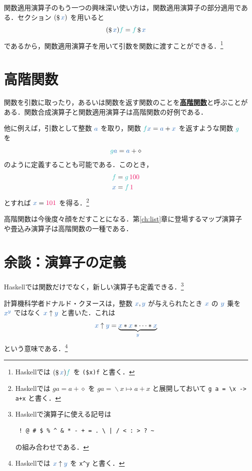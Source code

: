 \documentclass[a5paper,twoside,fleqn,draft]{jsbook}
\def\constantColor{WildStrawberry}
\def\varColor{NavyBlue}
\def\funcColor{BlueGreen}
\newcommand{\programminglanguage}[1]{\textsf{#1}}
\newcommand{\haskell}{\programminglanguage{Haskell}}
\newcommand{\keyword}[1]{{\underline{\textbf{#1}}}}
\newcommand{\code}[1]{\texttt{#1}}
\newcommand{\mConstant}[1]{\textcolor{\constantColor}{#1}}
\newcommand{\mOneNumber}{{\mConstant{1}}}
\newcommand{\mVar}[1]{\textcolor{\varColor}{#1}}
\newcommand{\mAnonParam}{\diamond}
\newcommand{\mAVar}{{\mVar{a}}}
\newcommand{\mXVar}{\mVar{x}}
\newcommand{\mYVar}{\mVar{y}}
\newcommand{\mFunc}[1]{\textcolor{\funcColor}{#1}}
\newcommand{\mFFunc}{{\mFunc{f}}}
\newcommand{\mGFunc}{\mFunc{g}}
\DeclareMathOperator{\mApply}{\$}
\DeclareMathOperator{\mLambda}{\backslash}
\DeclareMathOperator{\mLambdaArrow}{\mapsto}
\newcommand{\mLambdaEXP}[2]{\mLambda{#1}\mLambdaArrow{#2}} %
\begin{document}
関数適用演算子のもう一つの興味深い使い方は，関数適用演算子の部分適用である．セクション $(\mApply\mXVar)$ を用いると
\begin{equation}
  (\mApply\mXVar)\mFFunc
  =\mFFunc\mApply\mXVar
\end{equation}
であるから，関数適用演算子を用いて引数を関数に渡すことができる．\footnote{\haskell では $(\mApply\mXVar)\mFFunc$ を \code{(\$x)f} と書く．}

\section{高階関数}

関数を引数に取ったり，あるいは関数を返す関数のことを\keyword{高階関数}と呼ぶことがある．関数合成演算子と関数適用演算子は高階関数の好例である．

他に例えば，引数として整数 $\mAVar$ を取り，関数 $\mFFunc\mXVar=\mAVar+\mXVar$ を返すような関数 $\mGFunc$ を
\begin{equation}
  \mGFunc\mAVar
  =\mAVar+\mAnonParam
\end{equation}
のように定義することも可能である．このとき，
\begin{align}
  \mFFunc
  &=\mGFunc\,\mConstant{100}\\
  \mXVar
  &=\mFFunc\,\mOneNumber
\end{align}
とすれば $\mXVar=\mConstant{101}$ を得る．\footnote{\haskell では $ga=a+\mAnonParam$ を $ga=\mLambdaEXP{x}{a+x}$ と展開しておいて \code{g a = \textbackslash x -> a+x} と書く．}

高階関数は今後度々顔をだすことになる．第\ref{ch:list}章に登場するマップ演算子や畳込み演算子は高階関数の一種である．

\section{余談：演算子の定義}

\haskell では関数だけでなく，新しい演算子も定義できる．\footnote{\haskell で演算子に使える記号は
\begin{verbatim}
 ! @ # $ % ^ & * - + = . \ | / < : > ? ~
\end{verbatim}%
の組み合わせである．}


計算機科学者ドナルド・クヌースは，整数 $\mXVar,\mYVar$ が与えられたとき $\mXVar$ の $\mYVar$ 乗を ${\mXVar}^{\mYVar}$ ではなく $\mXVar\uparrow\mYVar$ と書いた．これは
\begin{equation}
  \mXVar\uparrow\mYVar
  =\underbrace{\mXVar*\mXVar*\dotsb*\mXVar}_{\mYVar}
\end{equation}
という意味である．\footnote{\haskell では $\mXVar\uparrow\mYVar$ を \code{x\textasciicircum y} と書く．}
\end{document}
